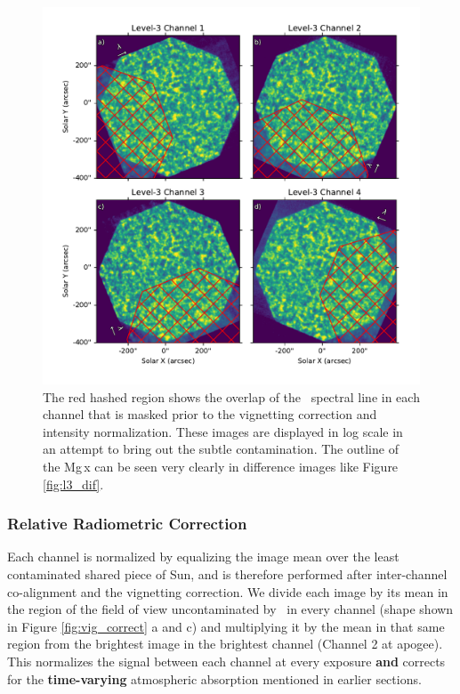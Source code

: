 \documentclass[linenumbers,trackchanges]{aastex63}
\begin{document}
        \begin{figure}
        	\centering
        	\includegraphics{mgx_overlap.pdf}
        	\caption{The red hashed region shows the overlap of the \mgxbright \ spectral line in each channel that is masked prior to the vignetting correction and intensity normalization. These images are displayed in log scale in an attempt to bring out the subtle contamination.  The outline of the Mg\,{\sc x} can be seen very clearly in difference images like Figure \ref{fig:l3_dif}.
        	}

        	\label{fig:mgx_overlap}
        \end{figure}
        
        

        
    \subsubsection{Relative Radiometric Correction }
        Each channel is normalized by equalizing the image mean over the least contaminated shared piece of Sun, and is therefore performed after inter-channel co-alignment and the vignetting correction.
        We divide each image by its mean in the region of the field of view uncontaminated by \mgxbright \ in every channel (shape shown in Figure \ref{fig:vig_correct} a and c) and multiplying it by the mean in that same region from the brightest image in the brightest channel (Channel 2 at apogee).
        This normalizes the signal between each channel at every exposure \textbf{and} corrects for the \textbf{time-varying} atmospheric absorption mentioned in earlier sections. 
\end{document}
